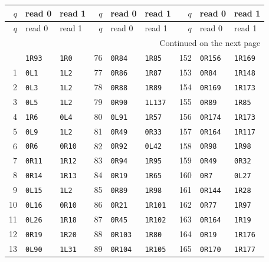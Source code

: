 \small
\begin{longtable}{rll@{\hspace{8mm}}rll@{\hspace{8mm}}rll}
\toprule
$q$ & read 0 & read 1 & $q$ & read 0 & read 1 & $q$ & read 0 & read 1 \\
\midrule
\endfirsthead
\toprule
$q$ & read 0 & read 1 & $q$ & read 0 & read 1 & $q$ & read 0 & read 1 \\
\midrule
\endhead
\midrule\multicolumn{9}{r}{\small Continued on the next page}\\\endfoot
\bottomrule\endlastfoot
0 & \texttt{1R93} & \texttt{1R0} & 76 & \texttt{0R84} & \texttt{1R85} & 152 & \texttt{0R156} & \texttt{1R169} \\
1 & \texttt{0L1} & \texttt{1L2} & 77 & \texttt{0R86} & \texttt{1R87} & 153 & \texttt{0R84} & \texttt{1R148} \\
2 & \texttt{0L3} & \texttt{1L2} & 78 & \texttt{0R88} & \texttt{1R89} & 154 & \texttt{0R169} & \texttt{1R173} \\
3 & \texttt{0L5} & \texttt{1L2} & 79 & \texttt{0R90} & \texttt{1L137} & 155 & \texttt{0R89} & \texttt{1R85} \\
4 & \texttt{1R6} & \texttt{0L4} & 80 & \texttt{0L91} & \texttt{1R57} & 156 & \texttt{0R174} & \texttt{1R173} \\
5 & \texttt{0L9} & \texttt{1L2} & 81 & \texttt{0R49} & \texttt{0R33} & 157 & \texttt{0R164} & \texttt{1R117} \\
6 & \texttt{0R6} & \texttt{0R10} & 82 & \texttt{0R92} & \texttt{0L42} & 158 & \texttt{0R98} & \texttt{1R98} \\
7 & \texttt{0R11} & \texttt{1R12} & 83 & \texttt{0R94} & \texttt{1R95} & 159 & \texttt{0R49} & \texttt{0R32} \\
8 & \texttt{0R14} & \texttt{1R13} & 84 & \texttt{0R19} & \texttt{1R65} & 160 & \texttt{0R7} & \texttt{0L27} \\
9 & \texttt{0L15} & \texttt{1L2} & 85 & \texttt{0R89} & \texttt{1R98} & 161 & \texttt{0R144} & \texttt{1R28} \\
10 & \texttt{0L16} & \texttt{0R10} & 86 & \texttt{0R21} & \texttt{1R101} & 162 & \texttt{0R77} & \texttt{1R97} \\
11 & \texttt{0L26} & \texttt{1R18} & 87 & \texttt{0R45} & \texttt{1R102} & 163 & \texttt{0R164} & \texttt{1R19} \\
12 & \texttt{0R19} & \texttt{1R20} & 88 & \texttt{0R103} & \texttt{1R80} & 164 & \texttt{0R19} & \texttt{1R176} \\
13 & \texttt{0L90} & \texttt{1L31} & 89 & \texttt{0R104} & \texttt{1R105} & 165 & \texttt{0R170} & \texttt{1R177} \\

\end{longtable}
